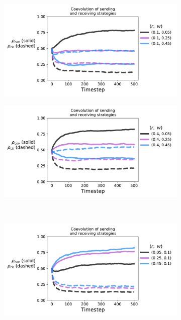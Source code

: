\documentclass[11pt,letterpaper]{article}
\begin{document}
\begin{appendices}
\begin{figure}[H]
  \centering
  \begin{subfigure}{0.49\textwidth}
    \includegraphics[width=\textwidth]{Figures/receptivity_evo_r=0p1.pdf}
  \caption{}
  \end{subfigure}
  \begin{subfigure}{0.49\textwidth}
    \includegraphics[width=\textwidth]{Figures/receptivity_evo_r=0p4.pdf}
  \caption{}
  \end{subfigure} \\
  \begin{subfigure}{0.49\textwidth}
    \includegraphics[width=\textwidth]{Figures/receptivity_evo_w=0p1.pdf}

\end{subfigure}
\end{figure}
\end{appendices}
\end{document}
